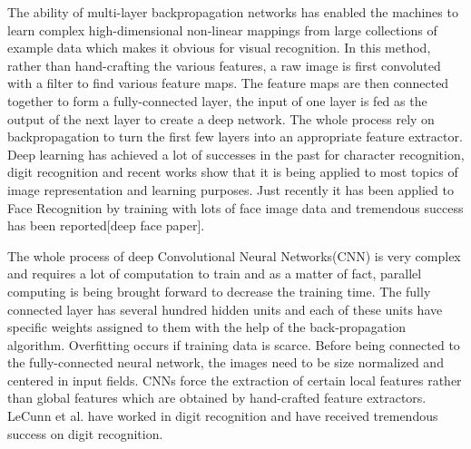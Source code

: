 The ability of multi-layer backpropagation networks has enabled the machines to learn complex high-dimensional non-linear mappings from large collections of example data which makes it obvious for visual recognition. In this method, rather than hand-crafting the various features, a raw image is first convoluted with a filter to find various feature maps. The feature maps are then connected together to form a fully-connected layer, the input of one layer is fed as the output of the next layer to create a deep network. The whole process rely on backpropagation to turn the first few layers into an appropriate feature extractor. Deep learning has achieved a lot of successes in the past for character recognition, digit recognition and recent works show that it is being applied to most topics of image representation and learning purposes. Just recently it has been applied to Face Recognition by training with lots of face image data and tremendous success has been reported[deep face paper].

The whole process of deep Convolutional Neural Networks(CNN)\cite{cnn} is very complex and requires a lot of computation to train and as a matter of fact, parallel computing is being brought forward to decrease the training time. The fully connected layer has several hundred hidden units and each of these units have specific weights assigned to them with the help of the back-propagation algorithm. Overfitting occurs if training data is scarce. Before being connected to the fully-connected neural network, the images need to be size normalized and centered in input fields. CNNs force the extraction of certain local features rather than global features which are obtained by hand-crafted feature extractors. LeCunn et al.\cite{lecun} have worked in digit recognition and have received tremendous success on digit recognition.


